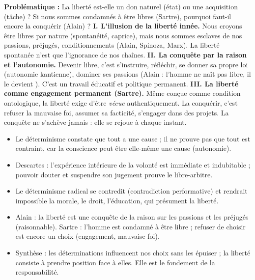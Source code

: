 \documentclass[11pt]{article}
\newcommand{\cle}[1]{{\popxbold\color{popdark}#1}}
\begin{document}
\begin{corrige}
\textbf{Problématique :} La liberté est-elle un don naturel (état) ou une acquisition (tâche) ? Si nous sommes \guillemotleft condamnés à être libres \guillemotright (Sartre), pourquoi faut-il encore la \guillemotleft conquérir \guillemotright (Alain) ?
\textbf{I. L'illusion de la liberté innée.} Nous croyons être libres par nature (spontanéité, caprice), mais nous sommes esclaves de nos passions, préjugés, conditionnements (Alain, Spinoza, Marx). La liberté spontanée n'est que l'ignorance de nos chaînes.
\textbf{II. La conquête par la raison et l'autonomie.} Devenir libre, c'est s'instruire, réfléchir, se donner sa propre loi (autonomie kantienne), dominer ses passions (Alain : \guillemotleft l'homme ne naît pas libre, il le devient \guillemotright). C'est un travail éducatif et politique permanent.
\textbf{III. La liberté comme engagement permanent (Sartre).} Même conçue comme condition ontologique, la liberté exige d'être \emph{vécue} authentiquement. La conquérir, c'est refuser la mauvaise foi, assumer sa facticité, s'engager dans des projets. La conquête ne s'achève jamais : elle se rejoue à chaque instant.
\end{corrige}

\begin{aretenir}
\begin{itemize}
\item Le déterminisme constate que tout a une cause ; il ne prouve pas que tout est contraint, car la conscience peut être elle-même une cause (\cle{autonomie}).
\item Descartes : l'expérience intérieure de la volonté est immédiate et indubitable ; pouvoir douter et suspendre son jugement prouve le \cle{libre-arbitre}.
\item Le déterminisme radical se contredit (\cle{contradiction performative}) et rendrait impossible la morale, le droit, l'éducation, qui présument la liberté.
\item Alain : la liberté est une conquête de la \cle{raison} sur les passions et les préjugés (\cle{raisonnable}). Sartre : l'homme est \guillemotleft condamné à être libre \guillemotright ; refuser de choisir est encore un choix (\cle{engagement}, \cle{mauvaise foi}).
\item Synthèse : les déterminations influencent nos choix sans les épuiser ; la liberté consiste à prendre position face à elles. Elle est le fondement de la responsabilité.
\end{itemize}
\end{aretenir}
\end{document}
